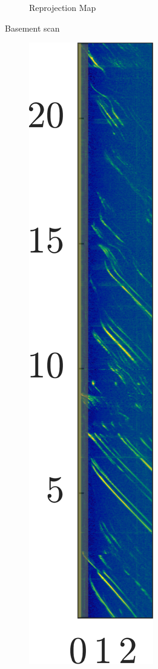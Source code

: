 \begin{figure}[htbp]
\begin{subfigure}[b]{0.475\textwidth}
        \caption{\small Reprojection Map}
    \end{subfigure}%
    \caption{Basement scan}
\end{figure}




\begin{figure}[htbp]
    \centering
    \begin{subfigure}[t]{0.32\linewidth}
        \centering
        \includegraphics[width=\linewidth]{gfx/results/sauna_input.png}

\end{subfigure}
\end{figure}
